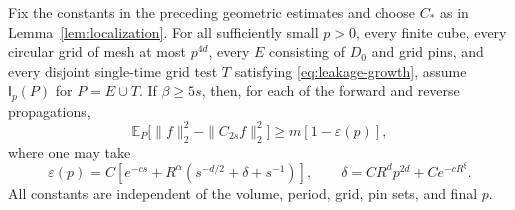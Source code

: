 \begin{proposition}\label{prop:leakage}
Fix the constants in the preceding geometric estimates and choose
$C_*$ as in Lemma~\ref{lem:localization}.  For all sufficiently small
$p>0$, every finite cube, every circular grid of mesh at most $p^{4d}$,
every $E$ consisting of $D_0$ and grid pins, and every disjoint
single-time grid test $T$ satisfying \eqref{eq:leakage-growth}, assume
$\mathsf I_p(P)$ for $P=E\cup T$.  If $\beta\ge5s$, then, for
each of the forward and reverse propagations,
\begin{equation}\label{eq:expected-leakage}
 \mathbb E_P\bigl[\|f\|_2^2-\|C_{2s}f\|_2^2\bigr]
             \ge m[1-\varepsilon(p)],
\end{equation}
where one may take
\begin{equation}\label{eq:epsilon-definition}
 \varepsilon(p)=C\left[e^{-cs}
       +R^\alpha\left(s^{-d/2}+\delta+s^{-1}\right)\right],
 \qquad \delta=C R^d p^{2d}+C e^{-cR^\xi}.
\end{equation}
All constants are independent of the volume, period, grid, pin sets,
and final $p$.
\end{proposition}

